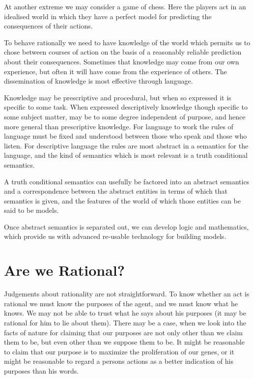 At another extreme we may consider a game of chess.
Here the players act in an idealised world in which they have a perfect model for predicting the consequences of their actions.

To behave rationally we need to have knowledge of the world which permits us to chose between courses of action on the basis of a reasonably reliable prediction about their consequences.
Sometimes that knowledge may come from our own experience, but often it will have come from the experience of others.
The dissemination of knowledge is most effective through language.

Knowledge may be prescriptive and procedural, but when so expressed it is specific to some task.
When expressed descriptively knowledge though specific to some subject matter, may be to some degree independent of purpose, and hence more general than prescriptive knowledge.
For language to work the rules of language must be fixed and understood between those who speak and those who listen.
For descriptive language the rules are most abstract in a semantics for the language, and the kind of semantics which is most relevant is a truth conditional semantics.

A truth conditional semantics can usefully be factored into an abstract semantics and a correspondence between the abstract entities in terms of which that semantics is given, and the features of the world of which those entities can be said to be models.

Once abstract semantics is separated out, we can develop logic and mathematics, which provide us with advanced re-usable technology for building models.

\section{Are we Rational?}

Judgements about rationality are not straightforward.
To know whether an act is rational we must know the purposes of the agent, and we must know what he knows.
We may not be able to trust what he says about his purposes (it may be rational for him to lie about them).
There may be a case, when we look into the facts of nature for claiming that our purposes are not only other than we claim them to be, but even other than we suppose them to be.
It might be reasonable to claim that our purpose is to maximize the proliferation of our genes, or it might be reasonable to regard a persons actions as a better indication of his purposes than his words.

